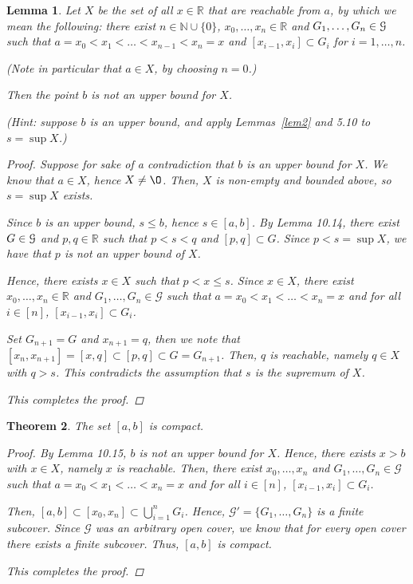 \documentclass[11pt]{article}
\newcommand{\bbN}{\mathbb{N}}
\newcommand{\bbR}{\mathbb{R}}
\renewcommand{\emptyset}{\O}
\renewcommand{\_}[1]{\underline{ #1 }}
\newtheorem{theorem}{Theorem}[section]
\newtheorem{lemma}[theorem]{Lemma}
\theoremstyle{definition}
\numberwithin{equation}{subsection}
\begin{document}
\begin{lemma} Let $X$ be the set of all $x\in \bbR$ that are \emph{reachable from $a$}, by which we mean the following: there exist $n\in\bbN\cup\{0\}$, $x_0,\ldots,x_n\in \bbR$ and $G_1,\ldots,G_n\in\mathcal G$ such that $a=x_0<x_1<\ldots<x_{n-1}<x_n=x$ and $[x_{i-1},x_i]\subset G_i$ for $i=1,\ldots,n$.

(Note in particular that $a\in X$, by choosing $n=0$.)

Then the point $b$ is not an upper bound for $X$.

(Hint: suppose $b$ is an upper bound, and apply Lemmas~\ref{lem2} and 5.10 to $s=\sup X$.)


\begin{proof}
Suppose for sake of a contradiction that $b$ is an upper bound for $X$. We know that $a \in X$, hence $X \neq \emptyset$. Then, $X$ is non-empty and bounded above, so $s = \sup X$ exists.

Since $b$ is an upper bound, $s \leq b$, hence $s \in [a,b]$. By Lemma 10.14, there exist $G\in\mathcal G$ and $p,q\in \bbR$ such that $p<s<q$ and $[p,q]\subset G$. Since $p<s=\sup X$, we have that $p$ is not an upper bound of $X$.

Hence, there exists $x \in X$ such that $p<x\leq s$. Since $x \in X$, there exist $x_0, \dots, x_n \in \bbR$ and $G_1, \dots, G_n \in \mathcal{G}$ such that $a=x_0<x_1<\dots<x_n=x$ and for all $i \in [n]$, $[x_{i-1},x_i] \subset G_i$. 

Set $G_{n+1}=G$ and $x_{n+1}=q$, then we note that $[x_n, x_{n+1}]=[x,q]\subset [p,q] \subset G = G_{n+1}$. Then, $q$ is reachable, namely $q \in X$ with $q>s$. This contradicts the assumption that $s$ is the supremum of $X$.

This completes the proof.


\renewcommand\qedsymbol{QED}
\end{proof}



\end{lemma}


\begin{theorem}\label{closedintervalsarecompact}
The set $[a, b]$ is compact.

\begin{proof}
By Lemma 10.15, $b$ is not an upper bound for $X$. Hence, there exists $x>b$ with $x \in X$, namely $x$ is reachable. Then, there exist $x_0, \dots, x_n$ and $G_1, \dots, G_n \in \mathcal{G}$ such that $a=x_0<x_1<\dots<x_n=x$ and for all $i \in [n]$, $[x_{i-1}, x_i] \subset G_i$. 

Then, $[a,b] \subset [x_0, x_n] \subset \bigcup_{i=1}^n G_i$. Hence, $\mathcal{G'} = \{G_1, \dots, G_n\}$ is a finite subcover. Since $\mathcal{G}$ was an arbitrary open cover, we know that for every open cover there exists a finite subcover. Thus, $[a,b]$ is compact.

This completes the proof.

\renewcommand\qedsymbol{QED}
\end{proof}


\end{theorem}
\end{document}
